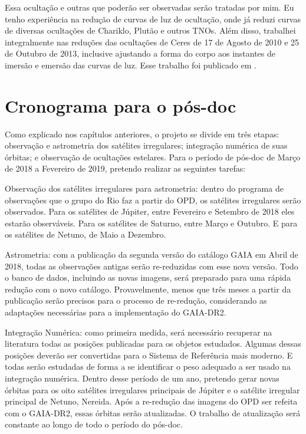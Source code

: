 \documentclass[12pt,a4paper]{report}
\begin{document}
Essa ocultação e outras que poderão ser observadas serão tratadas por mim. Eu tenho experiência na redução de curvas de luz de ocultação, onde já reduzi curvas de diversas ocultações de Chariklo, Plutão e outros TNOs. Além disso, trabalhei integralmente nas reduções das ocultações de Ceres de 17 de Agosto de 2010 e 25 de Outubro de 2013, inclusive ajustando a forma do corpo aos instantes de imersão e emersão das curvas de luz. Esse trabalho foi publicado em \cite{GomesJunior2015-Ceres}.

\section*{Cronograma para o pós-doc}

\indent \indent Como explicado nos capítulos anteriores, o projeto se divide em três etapas: observação e astrometria dos satélites irregulares; integração numérica de suas órbitas; e observação de ocultações estelares. Para o período de pós-doc de Março de 2018 a Fevereiro de 2019, pretendo realizar as seguintes tarefas:

Observação dos satélites irregulares para astrometria: dentro do programa de observações que o grupo do Rio faz a partir do OPD, os satélites irregulares serão observados. Para os satélites de Júpiter, entre Fevereiro e Setembro de 2018 eles estarão observáveis. Para os satélites de Saturno, entre Março e Outubro. E para os satélites de Netuno, de Maio a Dezembro.

Astrometria: com a publicação da segunda versão do catálogo GAIA em Abril de 2018, todas as observações antigas serão re-reduzidas com esse nova versão. Todo o banco de dados, incluindo as novas imagens, será preparado para uma rápida redução com o novo catálogo. Provavelmente, menos que três meses a partir da publicação serão precisos para o processo de re-redução, considerando as adaptações necessárias para a implementação do GAIA-DR2.

Integração Numérica: como primeira medida, será necessário recuperar na literatura todas as posições publicadas para os objetos estudados. Algumas dessas posições deverão ser convertidas para o Sistema de Referência mais moderno. E todas serão estudadas de forma a se identificar o peso adequado a ser usado na integração numérica. Dentro desse período de um ano, pretendo gerar novas órbitas para os oito satélites irregulares principais de Júpiter e o satélite irregular principal de Netuno, Nereida. Após a re-redução das imagens do OPD ser refeita com o GAIA-DR2, essas órbitas serão atualizadas.  O trabalho de atualização será constante ao longo de todo o período do pós-doc.
\end{document}
